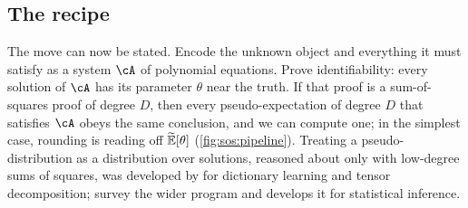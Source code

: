 \begin{refsection}
\subsection{The recipe}\label{sec:sos:recipe}

The move can now be stated. Encode the unknown object and everything it must satisfy as a system $\cA$ of polynomial equations. Prove identifiability: every solution of $\cA$ has its parameter $\theta$ near the truth. If that proof is a sum-of-squares proof of degree $D$, then every pseudo-expectation of degree $D$ that satisfies $\cA$ obeys the same conclusion, and we can compute one; in the simplest case, rounding is reading off $\widetilde{\mathbb{E}}[\theta]$ (\cref{fig:sos:pipeline}). Treating a pseudo-distribution as a distribution over solutions, reasoned about only with low-degree sums of squares, was developed by \textcite{BarakKelnerSteurer2015} for dictionary learning and tensor decomposition; \textcite{BarakSteurer2014} survey the wider program and \textcite{Hopkins2018} develops it for statistical inference.


\end{refsection}

